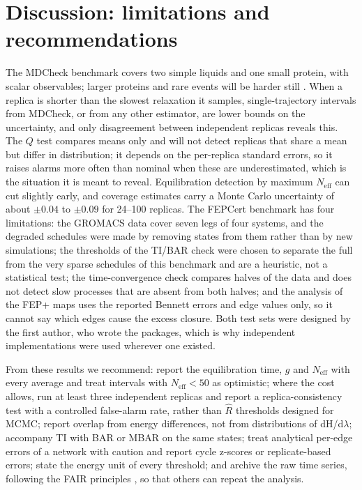 \documentclass[9pt,lessons]{livecoms}
\begin{document}
\section{Discussion: limitations and recommendations}
The MDCheck benchmark covers two simple liquids and one small protein, with scalar observables; larger proteins and rare events will be harder still \cite{zuckerman2011,sawle2016}. When a replica is shorter than the slowest relaxation it samples, single-trajectory intervals from MDCheck, or from any other estimator, are lower bounds on the uncertainty, and only disagreement between independent replicas reveals this. The $Q$ test compares means only and will not detect replicas that share a mean but differ in distribution; it depends on the per-replica standard errors, so it raises alarms more often than nominal when these are underestimated, which is the situation it is meant to reveal. Equilibration detection by maximum $N_{\mathrm{eff}}$ can cut slightly early, and coverage estimates carry a Monte Carlo uncertainty of about $\pm 0.04$ to $\pm 0.09$ for 24--100 replicas. The FEPCert benchmark has four limitations: the GROMACS data cover seven legs of four systems, and the degraded schedules were made by removing states from them rather than by new simulations; the thresholds of the TI/BAR check were chosen to separate the full from the very sparse schedules of this benchmark and are a heuristic, not a statistical test; the time-convergence check compares halves of the data and does not detect slow processes that are absent from both halves; and the analysis of the FEP+ maps uses the reported Bennett errors and edge values only, so it cannot say which edges cause the excess closure. Both test sets were designed by the first author, who wrote the packages, which is why independent implementations were used wherever one existed.

From these results we recommend: report the equilibration time, $g$ and $N_{\mathrm{eff}}$ with every average and treat intervals with $N_{\mathrm{eff}} < 50$ as optimistic; where the cost allows, run at least three independent replicas and report a replica-consistency test with a controlled false-alarm rate, rather than $\hat{R}$ thresholds designed for MCMC; report overlap from energy differences, not from distributions of dH/d$\lambda$; accompany TI with BAR or MBAR on the same states; treat analytical per-edge errors of a network with caution and report cycle z-scores or replicate-based errors; state the energy unit of every threshold; and archive the raw time series, following the FAIR principles \cite{wilkinson2016}, so that others can repeat the analysis.
\end{document}
